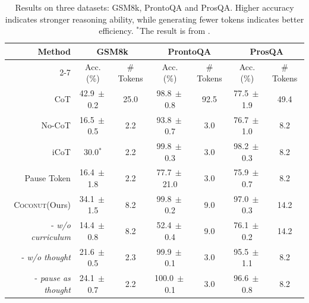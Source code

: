 \documentclass[]{fairmeta}
\newcommand{\ours}{\textsc{Coconut}\xspace}
\newcommand{\dataset}{ProsQA}
\begin{document}
\begin{table}
    \centering
    \label{tab:main}
    \begin{tabular}{@{}rcccccc}
    
    \toprule
    \multirow{2}{*}[-2pt]{Method} & \multicolumn{2}{c}{GSM8k} & \multicolumn{2}{c}{ProntoQA} & \multicolumn{2}{c}{\dataset}\\
    \cmidrule{2-7}
          & Acc. (\%) & \# Tokens & Acc. (\%) & \# Tokens & Acc. (\%) & \# Tokens \\
        \midrule
        CoT  & 42.9{\scriptsize$\ \pm$0.2} & 25.0 &  98.8{\scriptsize$\ \pm$0.8} & 92.5 &  77.5{\scriptsize$\ \pm$1.9} & 49.4 \\
        \midrule
        No-CoT  & 16.5{\scriptsize$\ \pm$0.5} & 2.2 & 93.8{\scriptsize$\ \pm$0.7}  & 3.0 & 76.7{\scriptsize$\ \pm$1.0} & 8.2 \\
        iCoT  & 30.0$^*$ &  2.2 &  99.8{\scriptsize$\ \pm$0.3} &  3.0 & 98.2{\scriptsize$\ \pm$0.3} & 8.2 \\
        Pause Token &  16.4{\scriptsize$\ \pm$1.8} & 2.2 & 77.7{\scriptsize$\ \pm$21.0} & 3.0 &  75.9{\scriptsize$\ \pm$0.7} & 8.2 \\
        \midrule
        
        \ours (Ours) & 34.1{\scriptsize$\ \pm$1.5} & 8.2  & 99.8{\scriptsize$\ \pm$0.2} & 9.0 &  97.0{\scriptsize$\ \pm$0.3} & 14.2 \\
        
        - \textit{w/o curriculum} & 14.4{\scriptsize$\ \pm$0.8} & 8.2 & 52.4{\scriptsize$\ \pm$0.4} & 9.0 &  76.1{\scriptsize$\ \pm$0.2} & 14.2 \\
        - \textit{w/o thought} & 21.6{\scriptsize$\ \pm$0.5}  & 2.3 &  99.9{\scriptsize$\ \pm$0.1} & 3.0 &  95.5{\scriptsize$\ \pm$1.1} & 8.2 \\
        - \textit {pause as thought} & 24.1{\scriptsize$\ \pm$0.7} & 2.2 & 100.0{\scriptsize$\ \pm$0.1} & 3.0 &  96.6{\scriptsize$\ \pm$0.8} & 8.2 \\
    \bottomrule 
    \end{tabular}
     \small
    \caption{Results on three datasets: GSM8k, ProntoQA and ProsQA. Higher accuracy indicates stronger reasoning ability, while generating fewer tokens indicates better efficiency. $^*$The result is from \citet{deng2024explicit}.}
    \label{tab:main}
\end{table}
\end{document}

